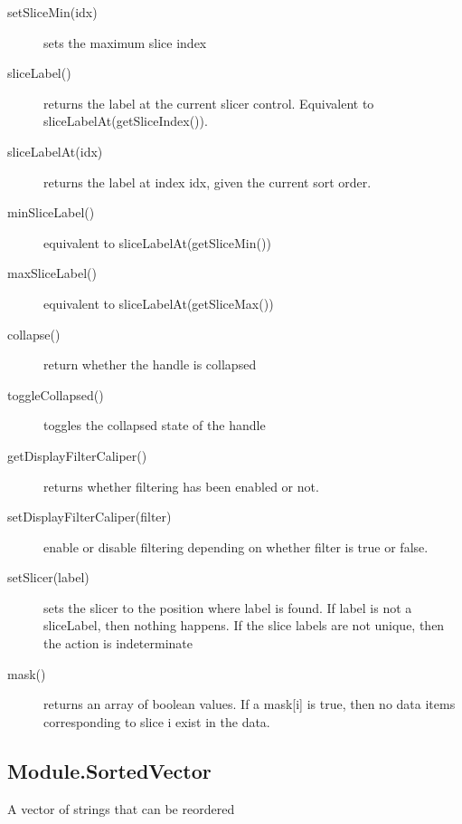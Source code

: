 \documentclass{article}
\begin{document}
\begin{description}
\begin{description}
\item[setSliceMin(idx)] sets the maximum slice index
\item[sliceLabel()] returns the label at the current slicer
  control. Equivalent to sliceLabelAt(getSliceIndex()).
\item[sliceLabelAt(idx)] returns the label at index idx, given the
  current sort order.
\item[minSliceLabel()] equivalent to sliceLabelAt(getSliceMin())
\item[maxSliceLabel()] equivalent to sliceLabelAt(getSliceMax())
\item[collapse()] return whether the handle is collapsed
\item[toggleCollapsed()] toggles the collapsed state of the handle
\item[getDisplayFilterCaliper()] returns whether filtering has been
  enabled or not.
\item[setDisplayFilterCaliper(filter)] enable or disable filtering
  depending on whether filter is true or false.
\item[setSlicer(label)] sets the slicer to the position where label is
  found. If label is not a sliceLabel, then nothing happens. If the
  slice labels are not unique, then the action is indeterminate
\item[mask()] returns an array of boolean values. If a mask[i] is
  true, then no data items corresponding to slice i exist in the
  data. 
  \end{description}
\end{description}

\subsection{Module.SortedVector}

A vector of strings that can be reordered
\end{document}
